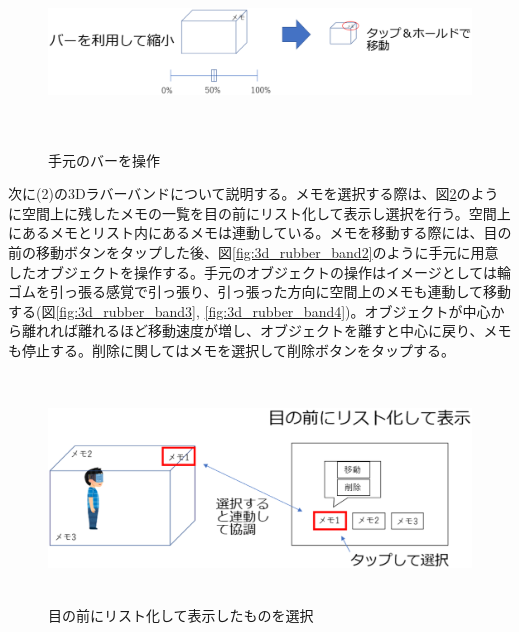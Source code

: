 \documentclass[11pt,a4j, titlepage]{jarticle} %
\begin{document}
\begin{figure}[H]
  \begin{center}
    \includegraphics[clip,height=5.0cm,width=17.0cm]{./shukusho_temoto.eps}
    \caption{手元のバーを操作}
    \label{fig:shukusho_temoto}
  \end{center}
\end{figure}

次に(2)の3Dラバーバンドについて説明する。メモを選択する際は、図\ref{fig:3d_rubber_band}のように空間上に残したメモの一覧を目の前にリスト化して表示し選択を行う。空間上にあるメモとリスト内にあるメモは連動している。メモを移動する際には、目の前の移動ボタンをタップした後、図\ref{fig:3d_rubber_band2}のように手元に用意したオブジェクトを操作する。手元のオブジェクトの操作はイメージとしては輪ゴムを引っ張る感覚で引っ張り、引っ張った方向に空間上のメモも連動して移動する(図\ref{fig:3d_rubber_band3}, \ref{fig:3d_rubber_band4})。オブジェクトが中心から離れれば離れるほど移動速度が増し、オブジェクトを離すと中心に戻り、メモも停止する。削除に関してはメモを選択して削除ボタンをタップする。

\begin{figure}[H]
  \begin{center}
    \includegraphics[clip,height=6.0cm,width=14.0cm]{./3d_rubber_band.eps}
    \caption{目の前にリスト化して表示したものを選択}
    \label{fig:3d_rubber_band}
  \end{center}
\end{figure}
\end{document}
